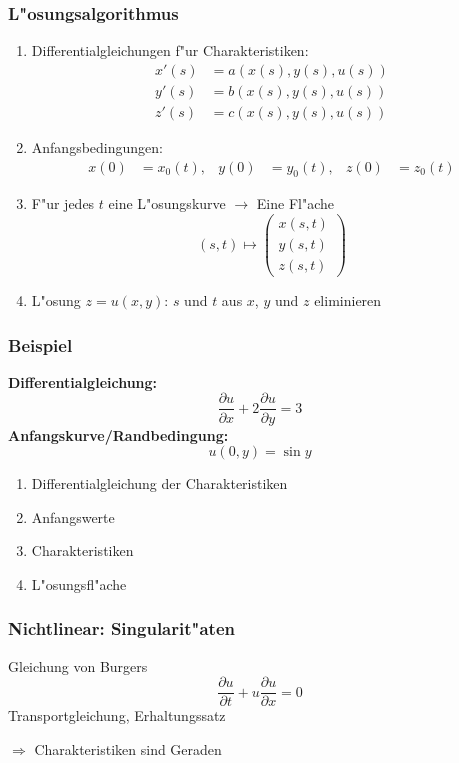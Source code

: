 \documentclass{beamer}
\begin{document}
\begin{frame}
\frametitle{L"osungsalgorithmus}
\begin{enumerate}
\item Differentialgleichungen f"ur Charakteristiken:
\pause
\begin{align*}
x'(s)&=a(x(s),y(s),u(s))\\
y'(s)&=b(x(s),y(s),u(s))\\
z'(s)&=c(x(s),y(s),u(s))
\end{align*}
\pause
\item Anfangsbedingungen:
\pause
\begin{align*}
x(0)&=x_0(t),&
y(0)&=y_0(t),&
z(0)&=z_0(t)
\end{align*}%
\pause
\item F"ur jedes $t$ eine L"osungskurve $\to$ Eine Fl"ache
\pause
\[
(s,t)\mapsto\begin{pmatrix}
x(s,t)\\
y(s,t)\\
z(s,t)
\end{pmatrix}
\]
\pause
\item L"osung $z=u(x,y)$:
\pause
$s$ und $t$ aus $x$, $y$ und $z$ eliminieren
\end{enumerate}
\end{frame}

\begin{frame}
\frametitle{Beispiel}
{\bf Differentialgleichung:}
\[
\frac{\partial u}{\partial x}
+2
\frac{\partial u}{\partial y}
=3
\]
{\bf Anfangskurve/Randbedingung:}
\[
u(0,y)=\sin y
\]
\begin{enumerate}
\item Differentialgleichung der Charakteristiken
\item Anfangswerte
\item Charakteristiken
\item L"osungsfl"ache
\end{enumerate}
\end{frame}

\begin{frame}
\frametitle{Nichtlinear: Singularit"aten}
Gleichung von Burgers
\[
\frac{\partial u}{\partial t}+u\frac{\partial u}{\partial x}=0
\]
Transportgleichung, Erhaltungssatz

\bigskip
\pause
$\Rightarrow$
Charakteristiken sind Geraden
\end{frame}
\end{document}
